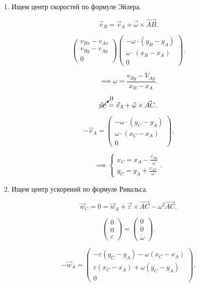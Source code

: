 \documentclass[a4paper,12pt]{report}
\begin{document}
\begin{enumerate}
  \item Ищем центр скоростей по формуле Эйлера.

\[
\vec{v}_B = \vec{v}_A + \vec{\omega} \times \vec{AB}
.\] 

\[
  \begin{pmatrix} 
    v_{Bx} - v_{Ax} \\
    v_{By} - v_{Ay} \\
    0
  \end{pmatrix} 
  \begin{pmatrix}
    -\omega \cdot \left( y_B - y_A \right) \\
    \omega \cdot ( x_B - x_A) \\
    0
  \end{pmatrix} 
.\] 

\[
  \implies \omega = \frac{v_{By} - V_{Ay}}{x_B - x_A}
.\] 

\[
  \cancelto{0}{\vec{v}_C} = \vec{v}_A + \vec{\omega} \times \vec{AC}
.\] 

\[
-\vec{v}_A = \begin{pmatrix} 
  -\omega \cdot (y_C - y_A) \\
  \omega \cdot (x_C - x_A) \\
  0
\end{pmatrix} 
.\] 

\[
\implies
\begin{cases}
  x_C = x_A - \frac{v_{Ay}}{\omega} \\
  y_C = y_A + \frac{v_{Ax}}{\omega}
\end{cases}
.\] 

  \item Ищем центр ускорений по формуле Ривальса.

\[
  \vec{w}_C = 0 = \vec{w}_A + \vec{\varepsilon} \times \vec{AC} - \omega^2 \vec{AC}
.\] 

\[
\begin{pmatrix} 0 \\ 0 \\ \varepsilon \end{pmatrix} =
\begin{pmatrix} 0 \\ 0 \\ \dot \omega \end{pmatrix} 
.\] 

\[
-\vec{w}_A = \begin{pmatrix} 
  -\varepsilon(y_C - y_A) - \omega(x_C - x_A) \\
  \varepsilon (x_C - x_A) + \omega(y_C - y_A) \\
  0
\end{pmatrix} 
.\] 


\end{enumerate}
\end{document}
